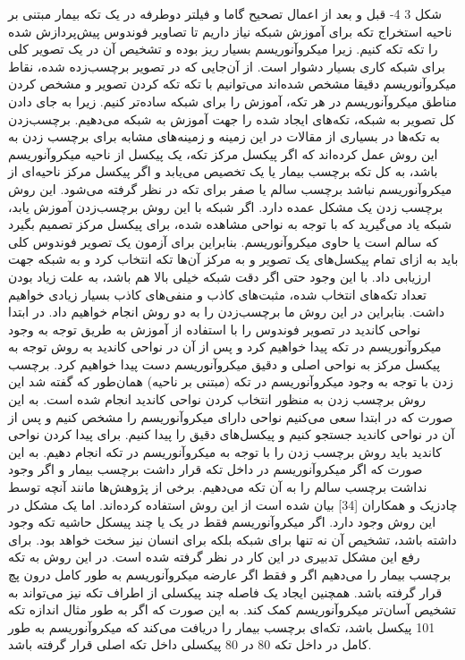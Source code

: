  
شکل ‏3 4- قبل و بعد از اعمال تصحیح گاما و فیلتر دوطرفه در یک تکه بیمار مبتنی بر ناحیه
استخراج تکه
برای آموزش شبکه نیاز داریم تا تصاویر فوندوس پیش‌پردازش شده را تکه تکه کنیم. زیرا میکروآنوریسم بسیار ریز بوده و تشخیص آن در یک تصویر کلی برای شبکه کاری بسیار دشوار است. از آن‌جایی که در تصویر برچسب‌زده شده، نقاط میکروآنوریسم دقیقا مشخص شده‌اند می‌توانیم با تکه تکه کردن تصویر و مشخص کردن مناطق میکروآنوریسم در هر تکه، آموزش را برای شبکه ساده‌تر کنیم. زیرا به جای دادن کل تصویر به شبکه، تکه‌های ایجاد شده را جهت آموزش به شبکه می‌دهیم.
برچسب‌زدن به تکه‌ها
در بسیاری از مقالات در این زمینه و زمینه‌های مشابه برای برچسب زدن به این روش عمل کرده‌اند که اگر پیکسل مرکز تکه، یک پیکسل از ناحیه میکروآنوریسم باشد، به کل تکه برچسب بیمار یا یک تخصیص می‌یابد و اگر پیکسل مرکز ناحیه‌ای از میکروآنوریسم نباشد برچسب سالم یا صفر برای تکه در نظر گرفته می‌شود. این روش برچسب زدن یک مشکل عمده دارد. اگر شبکه با این روش برچسب‌زدن آموزش یابد، شبکه یاد می‌گیرید که با توجه به نواحی مشاهده شده، برای پیکسل مرکز تصمیم بگیرد که سالم است یا حاوی میکروآنوریسم. بنابراین برای آزمون یک تصویر فوندوس کلی باید به ازای تمام پیکسل‌های یک تصویر و به مرکز آن‌ها تکه انتخاب کرد و به شبکه جهت ارزیابی داد. با این وجود حتی اگر دقت شبکه خیلی بالا هم باشد، به علت زیاد بودن تعداد تکه‌های انتخاب شده، مثبت‌های کاذب و منفی‌های کاذب بسیار زیادی خواهیم داشت.
بنابراین در این روش ما برچسب‌زدن را به دو روش انجام خواهیم داد. در ابتدا نواحی کاندید در تصویر فوندوس را با استفاده از آموزش به طریق توجه به وجود میکروآنوریسم در تکه پیدا خواهیم کرد و پس از آن در نواحی کاندید به روش توجه به پیکسل مرکز به نواحی اصلی و دقیق میکروآنوریسم دست پیدا خواهیم کرد.
برچسب ‌زدن با توجه به وجود میکروآنوریسم در تکه (مبتنی بر ناحیه)
همان‌طور که گفته شد این روش برچسب زدن به منظور انتخاب کردن نواحی کاندید انجام شده است. به این صورت که در ابتدا سعی می‌کنیم نواحی دارای میکروآنوریسم را مشخص کنیم و پس از آن در نواحی کاندید جستجو کنیم و پیکسل‌های دقیق را پیدا کنیم. برای پیدا کردن نواحی کاندید باید روش برچسب زدن را با توجه به میکروآنوریسم در تکه انجام دهیم. به این صورت که اگر میکروآنوریسم در داخل تکه قرار داشت برچسب بیمار و اگر وجود نداشت برچسب سالم را به آن تکه می‌دهیم. برخی از پژوهش‌ها مانند آنچه توسط چادزیک  و همکاران [34] بیان شده است از این روش استفاده کرده‌اند. اما یک مشکل در این روش وجود دارد. اگر میکروآنوریسم فقط در یک یا چند پیسکل حاشیه تکه وجود داشته باشد، تشخیص آن نه تنها برای شبکه بلکه برای انسان نیز سخت خواهد بود.
برای رفع این مشکل تدبیری در این کار در نظر گرفته شده است. در این روش به تکه برچسب بیمار را می‌دهیم اگر و فقط اگر عارضه میکروآنوریسم به طور کامل درون پچ قرار گرفته باشد. همچنین ایجاد یک فاصله چند پیکسلی از اطراف تکه نیز می‌تواند به تشخیص آسان‌تر میکروآنوریسم کمک کند. به این صورت که اگر به طور مثال اندازه تکه 101 پیکسل باشد، تکه‌ای برچسب بیمار را دریافت می‌کند که میکروآنوریسم به طور کامل در داخل تکه 80 در 80 پیکسلی داخل تکه اصلی قرار گرفته باشد.
